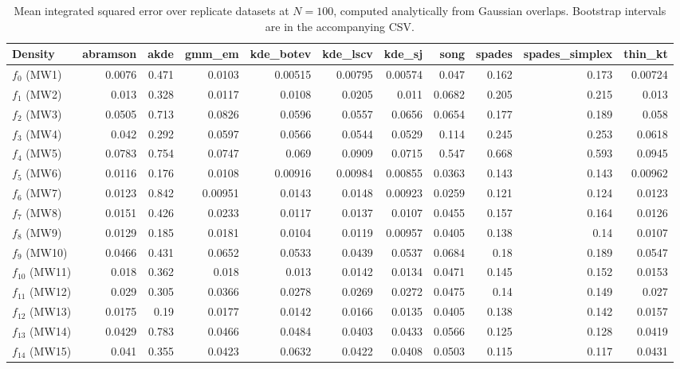 \begin{table}[htbp]
\centering
\caption{Mean integrated squared error over replicate datasets at $N=100$, computed analytically from Gaussian overlaps. Bootstrap intervals are in the accompanying CSV.}
\label{tab:ise-N100}
\begin{tabular}{lrrrrrrrrrr}
\toprule
Density & abramson & akde & gmm\_em & kde\_botev & kde\_lscv & kde\_sj & song & spades & spades\_simplex & thin\_kt \\
\midrule
$f_{0}$ (MW1) & 0.0076 & 0.471 & 0.0103 & 0.00515 & 0.00795 & 0.00574 & 0.047 & 0.162 & 0.173 & 0.00724 \\
$f_{1}$ (MW2) & 0.013 & 0.328 & 0.0117 & 0.0108 & 0.0205 & 0.011 & 0.0682 & 0.205 & 0.215 & 0.013 \\
$f_{2}$ (MW3) & 0.0505 & 0.713 & 0.0826 & 0.0596 & 0.0557 & 0.0656 & 0.0654 & 0.177 & 0.189 & 0.058 \\
$f_{3}$ (MW4) & 0.042 & 0.292 & 0.0597 & 0.0566 & 0.0544 & 0.0529 & 0.114 & 0.245 & 0.253 & 0.0618 \\
$f_{4}$ (MW5) & 0.0783 & 0.754 & 0.0747 & 0.069 & 0.0909 & 0.0715 & 0.547 & 0.668 & 0.593 & 0.0945 \\
$f_{5}$ (MW6) & 0.0116 & 0.176 & 0.0108 & 0.00916 & 0.00984 & 0.00855 & 0.0363 & 0.143 & 0.143 & 0.00962 \\
$f_{6}$ (MW7) & 0.0123 & 0.842 & 0.00951 & 0.0143 & 0.0148 & 0.00923 & 0.0259 & 0.121 & 0.124 & 0.0123 \\
$f_{7}$ (MW8) & 0.0151 & 0.426 & 0.0233 & 0.0117 & 0.0137 & 0.0107 & 0.0455 & 0.157 & 0.164 & 0.0126 \\
$f_{8}$ (MW9) & 0.0129 & 0.185 & 0.0181 & 0.0104 & 0.0119 & 0.00957 & 0.0405 & 0.138 & 0.14 & 0.0107 \\
$f_{9}$ (MW10) & 0.0466 & 0.431 & 0.0652 & 0.0533 & 0.0439 & 0.0537 & 0.0684 & 0.18 & 0.189 & 0.0547 \\
$f_{10}$ (MW11) & 0.018 & 0.362 & 0.018 & 0.013 & 0.0142 & 0.0134 & 0.0471 & 0.145 & 0.152 & 0.0153 \\
$f_{11}$ (MW12) & 0.029 & 0.305 & 0.0366 & 0.0278 & 0.0269 & 0.0272 & 0.0475 & 0.14 & 0.149 & 0.027 \\
$f_{12}$ (MW13) & 0.0175 & 0.19 & 0.0177 & 0.0142 & 0.0166 & 0.0135 & 0.0405 & 0.138 & 0.142 & 0.0157 \\
$f_{13}$ (MW14) & 0.0429 & 0.783 & 0.0466 & 0.0484 & 0.0403 & 0.0433 & 0.0566 & 0.125 & 0.128 & 0.0419 \\
$f_{14}$ (MW15) & 0.041 & 0.355 & 0.0423 & 0.0632 & 0.0422 & 0.0408 & 0.0503 & 0.115 & 0.117 & 0.0431 \\
\bottomrule
\end{tabular}
\end{table}

